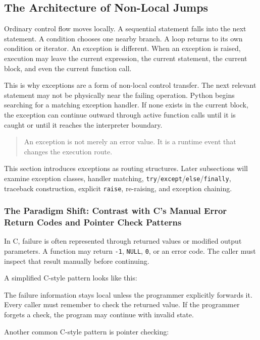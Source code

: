 \subsection{The Architecture of Non-Local Jumps}

Ordinary control flow moves locally. A sequential statement falls into the next statement. A condition chooses one nearby branch. A loop returns to its own condition or iterator. An exception is different. When an exception is raised, execution may leave the current expression, the current statement, the current block, and even the current function call.

This is why exceptions are a form of non-local control transfer. The next relevant statement may not be physically near the failing operation. Python begins searching for a matching exception handler. If none exists in the current block, the exception can continue outward through active function calls until it is caught or until it reaches the interpreter boundary.

\begin{quote}
An exception is not merely an error value. It is a runtime event that changes the execution route.
\end{quote}

This section introduces exceptions as routing structures. Later subsections will examine exception classes, handler matching, \texttt{try}/\texttt{except}/\texttt{else}/\texttt{finally}, traceback construction, explicit \texttt{raise}, re-raising, and exception chaining.

\subsubsection{The Paradigm Shift: Contrast with C's Manual Error Return Codes and Pointer Check Patterns}

In C, failure is often represented through returned values or modified output parameters. A function may return \texttt{-1}, \texttt{NULL}, \texttt{0}, or an error code. The caller must inspect that result manually before continuing.

A simplified C-style pattern looks like this:

The failure information stays local unless the programmer explicitly forwards it. Every caller must remember to check the returned value. If the programmer forgets a check, the program may continue with invalid state.

Another common C-style pattern is pointer checking:

